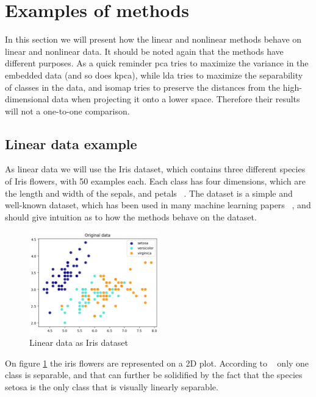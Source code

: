 \section{Examples of methods}\label{sec:examples-methods}
In this section we will present how the linear and nonlinear methods behave on linear and nonlinear data. It should be noted again that the methods have different purposes. As a quick reminder \gls{pca} tries to maximize the variance in the embedded data (and so does \gls{kpca}), while \gls{lda} tries to maximize the separability of classes in the data, and \gls{isomap} tries to preserve the distances from the high-dimensional data when projecting it onto a lower space. Therefore their results will not a one-to-one comparison.


\subsection{Linear data example}\label{subsec:linear-data-example}
As linear data we will use the Iris dataset, which contains three different species of Iris flowers, with 50 examples each. Each class has four dimensions, which are the length and width of the sepals, and petals ~\cite{iris-dataset}. The dataset is a simple and well-known dataset, which has been used in many machine learning papers ~\cite{iris-dataset}, and should give intuition as to how the methods behave on the dataset.

\begin{figure}[htb!]
\centering
\includegraphics[width=0.5\textwidth]{figures/theory-example-figures/linear-data.png}
\caption{Linear data as Iris dataset}
\label{fig:linear-data}
\end{figure}

On figure \ref{fig:linear-data} the iris flowers are represented on a 2D plot. According to ~\cite{iris-dataset} only one class is separable, and that can further be  solidified by the fact that the species setosa is the only class that is visually linearly separable.

